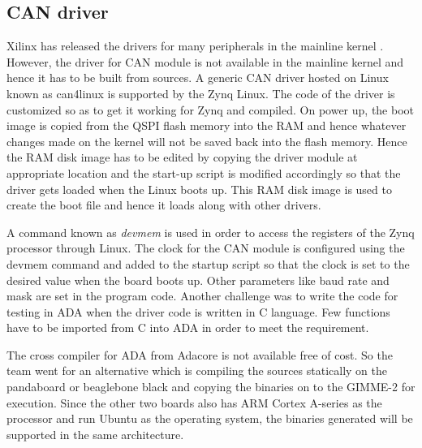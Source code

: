 \subsection{CAN driver}
Xilinx has released the drivers for many peripherals in the mainline kernel \cite{XilDrivers}. However, the driver for CAN module is not available in the mainline kernel and hence it has to be built from sources. A generic CAN driver hosted on Linux known as can4linux \cite{can4linux} is supported by the Zynq Linux. The code of the driver is customized so as to get it working for Zynq and compiled. On power up, the boot image is copied from the QSPI flash memory into the RAM and hence whatever changes made on the kernel will not be saved back into the flash memory. Hence the RAM disk image has to be edited by copying the driver module at appropriate location and the start-up script is modified accordingly so that the driver gets loaded when the Linux boots up. This RAM disk image is used to create the boot file and hence it loads along with other drivers. 

A command known as \textit{devmem} is used in order to access the registers of the Zynq processor through Linux. The clock for the CAN module is configured using the devmem command and added to the startup script so that the clock is set to the desired value when the board boots up. Other parameters like baud rate and mask are set in the program code. Another challenge was to write the code for testing in ADA when the driver code is written in C language. Few functions have to be imported from C into ADA in order to meet the requirement.

The cross compiler for ADA from Adacore is not available free of cost. So the team went for an alternative which is compiling the sources statically on the pandaboard or beaglebone black and copying the binaries on to the GIMME-2 for execution. Since the other two boards also has ARM Cortex A-series as the processor and run Ubuntu as the operating system, the binaries generated will be supported in the same architecture. 

%
